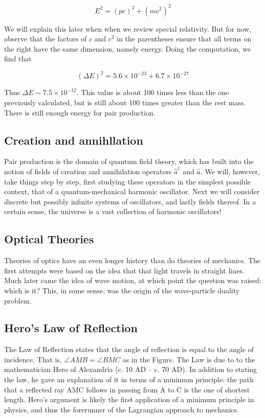 \begin{equation}
 E^2 = (pc)^2 + ( mc^2 )^2
\end{equation}

We will explain this later when when we review special relativity.  But for now, observe that the factors of $c$ and $c^2$ in the parentheses ensure that all terms on the right have the same dimension, namely energy.  Doing the computation, we find that

\begin{equation}
(\Delta E)^2 = 5.6\times 10^{-23} + 6.7\times 10^{-27}
\end{equation}

Thus $\Delta E \sim 7.5\times 10^{-12}$.  This value is about 100 times less than the one previously calculated, but is still about 100 times greater than the rest mass.  There is still enough energy for pair production.

\subsection{Creation and annihllation}
Pair production is the domain of quantum field theory, which has built into the notion of fields of creation and annihilation operators $\hat a^\dagger$ and $\hat a$.  We will, however, take things step by step, first studying these operators in the simplest possible context, that of a quantum-mechanical harmonic oscillator.  Next we will consider discrete but possibly infinite systems of oscillators, and lastly fields thereof.  In a certain sense, the universe is a vast collection of harmonic oscillators!

\subsection{Optical Theories}

Theories of optics have an even longer history than do theories of mechanics.  The first attempts were based on the idea that that light travels in straight lines.  Much later came the idea of wave motion, at which point the question was raised: which is it? This, in some sense, was the origin of the wave-particle duality problem.

\subsection{Hero's Law of Reflection}

The Law of Reflection states that the angle of reflection is equal to the angle of incidence.  That is, $\angle AMB = \angle BMC$ as in the Figure.  The Law is due to to the mathematician Hero of Alexandria (c. 10 AD -- c. 70 AD).  In addition to stating the law, he gave an explanation of it in terms of a minimum principle: the path that a reflected ray AMC follows in passing from A to C is the one of shortest length.  Hero's argument is likely the first application of a minimum principle in physics, and thus the forerunner of the Lagrangian approach to mechanics.

